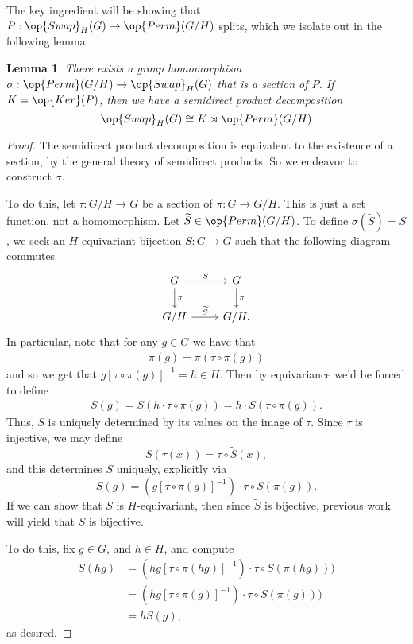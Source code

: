 \documentclass[12nt]{article}
\theoremstyle{plain}
\newtheorem{lemma}{Lemma}
\begin{document}
The key ingredient will be showing that $P : \op{Swap}_H(G) \to \op{Perm}(G/H)$ splits, which we isolate out in the following lemma. 

\begin{lemma}
There exists a group homomorphism $\sigma : \op{Perm}(G/H) \to \op{Swap}_H(G)$ that is a section of $P$. If $K = \op{Ker}(P)$, then we have a semidirect product decomposition
\[
\op{Swap}_H(G) \cong K \rtimes \op{Perm}(G/H)
\]
\end{lemma}

\begin{proof}
The semidirect product decomposition is equivalent to the existence of a section, by the general theory of semidirect products. So we endeavor to construct $\sigma$.

To do this, let $\tau : G/H \to G$ be a section of $\pi : G \to G/H$. This is just a set function, not a homomorphism. Let $\widetilde{S} \in \op{Perm}(G/H)$. To define $\sigma(\widetilde{S}) = S$, we seek an $H$-equivariant bijection $S : G \to G$ such that the following diagram commutes
\[
\begin{tikzcd}
G \ar[r, "S"] \ar[d, "\pi"] & G \ar[d, "\pi"]\\
G/H \ar[r, "\widetilde{S}"] & G/H.
\end{tikzcd}
\]
In particular, note that for any $g \in G$ we have that 
\begin{align*}
\pi(g) = \pi(\tau \circ \pi(g))
\end{align*}
and so we get that $g[\tau \circ \pi(g)]^{-1} = h \in H$. Then by equivariance we'd be forced to define
\begin{align*}
S(g) = S(h \cdot \tau \circ \pi(g)) = h \cdot S(\tau \circ \pi(g)).
\end{align*}
Thus, $S$ is uniquely determined by its values on the image of $\tau$. Since $\tau$ is injective, we may define
\[
S(\tau(x)) = \tau \circ \widetilde{S}(x),
\]
and this determines $S$ uniquely, explicitly via 
\[
S(g) = (g[\tau \circ \pi(g)]^{-1}) \cdot \tau \circ \widetilde{S}(\pi(g)).
\]
If we can show that $S$ is $H$-equivariant, then since $\widetilde{S}$ is bijective, previous work will yield that $S$ is bijective. 

To do this, fix $g \in G$, and $h \in H$, and compute
\begin{align*}
S(hg) &= (hg[\tau \circ \pi(hg)]^{-1}) \cdot \tau \circ \widetilde{S}(\pi(hg))) \\
	&= (hg[\tau \circ \pi(g)]^{-1}) \cdot \tau \circ \widetilde{S}(\pi(g))) \\
	&= h S(g),
\end{align*}
as desired.


\end{proof}
\end{document}
